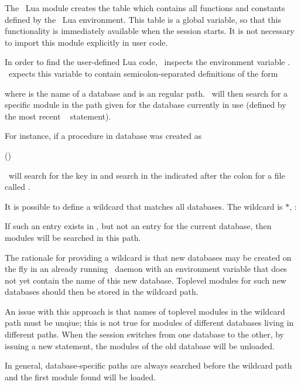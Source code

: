 The \nowdb\ Lua module creates the table 
 which contains all
functions and constants defined by
the \nowdb\ Lua environment.
This table is a global variable,
so that this functionality is immediately available
when the session starts.
It is not necessary to import this module explicitly
in user code.

In order to find the user-defined Lua code,
\nowdb\ inspects the environment variable
. \nowdb\ expects
this variable to contain
semicolon-separated definitions of the form


where  is the name of a database and
 is an regular  path.
\nowdb\ will then search for a specific module
in the path given for the database currently
in use (defined by the most recent
\sql\  statement).

For instance, if a procedure in database 
was created as

 ()
 

\nowdb\ will search for the key  in
 and search in the 
indicated after the colon for a file called
.

It is possible to define a wildcard that matches all databases.
The wildcard is $\ast$, \eg:


If such an entry exists 
in ,
but not an entry for the current database,
then modules will be searched in this path.

The rationale for providing a wildcard is that
new databases may be created on the fly in an already
running \nowdb\ daemon with an environment variable
that does not yet contain the name of this new database.
Toplevel modules for such new databases
should then be stored in the wildcard path.

An issue with this approach is that names
of toplevel modules in the wildcard path must be unqiue;
this is not true for modules of different
databases living in different paths.
When the session switches from one database to the other,
by issuing a new  statement,
the modules of the old database will be unloaded.

In general, database-specific paths are always 
searched before the wildcard path
and the first module found will be
loaded.

